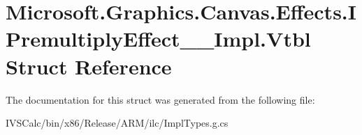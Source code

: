 \hypertarget{struct_microsoft_1_1_graphics_1_1_canvas_1_1_effects_1_1_i_premultiply_effect_____impl_1_1_vtbl}{}\section{Microsoft.\+Graphics.\+Canvas.\+Effects.\+I\+Premultiply\+Effect\+\_\+\+\_\+\+Impl.\+Vtbl Struct Reference}
\label{struct_microsoft_1_1_graphics_1_1_canvas_1_1_effects_1_1_i_premultiply_effect_____impl_1_1_vtbl}


The documentation for this struct was generated from the following file\+:\begin{DoxyCompactItemize}
\item 
I\+V\+S\+Calc/bin/x86/\+Release/\+A\+R\+M/ilc/Impl\+Types.\+g.\+cs\end{DoxyCompactItemize}
